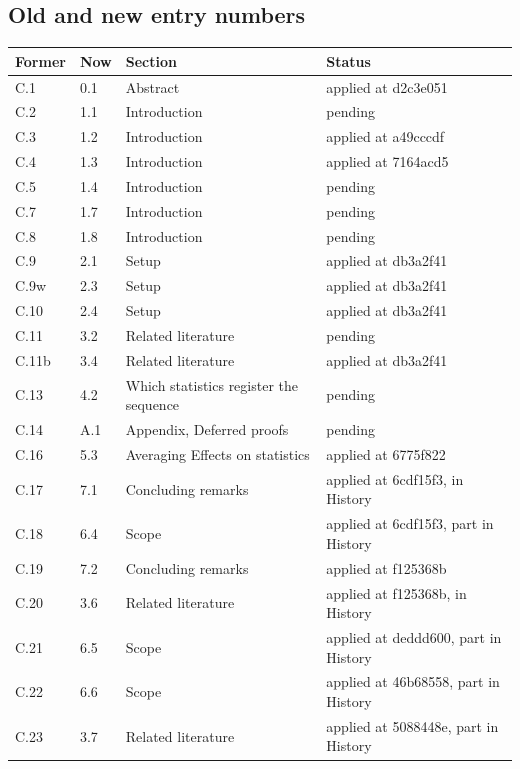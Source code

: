 \documentclass[10pt]{article}
\theoremstyle{definition}
\begin{document}
\subsection*{Old and new entry numbers}
{\small
\begin{longtable}{|p{2.2cm}|p{2.2cm}|p{9cm}|p{4cm}|}
\hline
\textbf{Former} & \textbf{Now} & \textbf{Section} & \textbf{Status} \\ \hline\endhead
C.1 & 0.1 & Abstract & applied at d2c3e051 \\ \hline
C.2 & 1.1 & Introduction & pending \\ \hline
C.3 & 1.2 & Introduction & applied at a49cccdf \\ \hline
C.4 & 1.3 & Introduction & applied at 7164acd5 \\ \hline
C.5 & 1.4 & Introduction & pending \\ \hline
C.7 & 1.7 & Introduction & pending \\ \hline
C.8 & 1.8 & Introduction & pending \\ \hline
C.9 & 2.1 & Setup & applied at db3a2f41 \\ \hline
C.9w & 2.3 & Setup & applied at db3a2f41 \\ \hline
C.10 & 2.4 & Setup & applied at db3a2f41 \\ \hline
C.11 & 3.2 & Related literature & pending \\ \hline
C.11b & 3.4 & Related literature & applied at db3a2f41 \\ \hline
C.13 & 4.2 & Which statistics register the sequence & pending \\ \hline
C.14 & A.1 & Appendix, Deferred proofs & pending \\ \hline
C.16 & 5.3 & Averaging Effects on statistics & applied at 6775f822 \\ \hline
C.17 & 7.1 & Concluding remarks & applied at 6cdf15f3, in History \\ \hline
C.18 & 6.4 & Scope & applied at 6cdf15f3, part in History \\ \hline
C.19 & 7.2 & Concluding remarks & applied at f125368b \\ \hline
C.20 & 3.6 & Related literature & applied at f125368b, in History \\ \hline
C.21 & 6.5 & Scope & applied at deddd600, part in History \\ \hline
C.22 & 6.6 & Scope & applied at 46b68558, part in History \\ \hline
C.23 & 3.7 & Related literature & applied at 5088448e, part in History \\ \hline

\end{longtable}}
\end{document}
